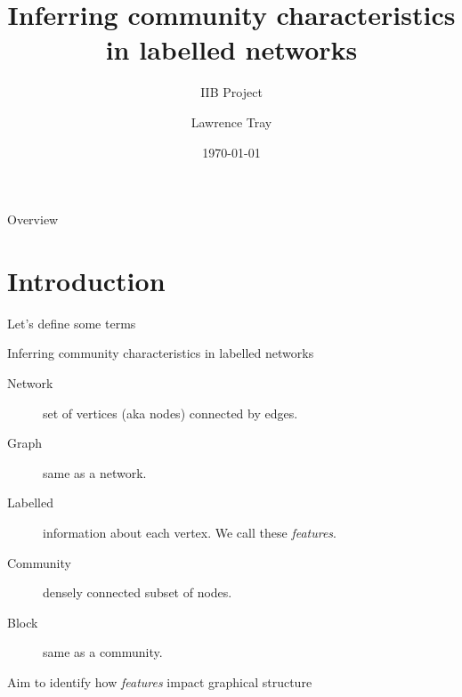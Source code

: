 \documentclass{beamer}
\title[Labelled network inference]{Inferring community characteristics in labelled networks}
\subtitle{IIB Project}
\author{Lawrence Tray}
\institute{Ioannis Kontoyiannis}
\date{\today}
\begin{document}
	
	\begin{frame}
		\titlepage
	\end{frame}

	\begin{frame}{Overview}
		\tableofcontents
	\end{frame}

\section{Introduction}
	
	\begin{frame}{Let's define some terms}
		\begin{block}{Inferring community characteristics in labelled networks}
			\begin{description}
				\item[Network] set of vertices (aka nodes) connected by edges.
				\item[Graph] same as a network.
				\item[Labelled] information about each vertex. We call these {\em features}.
				\item[Community] densely connected subset of nodes.
				\item[Block] same as a community.
			\end{description}
		\end{block}
		\centering
		\vspace{1cm}
		Aim to identify how {\em features} impact graphical structure
	\end{frame}
	
\end{document}
